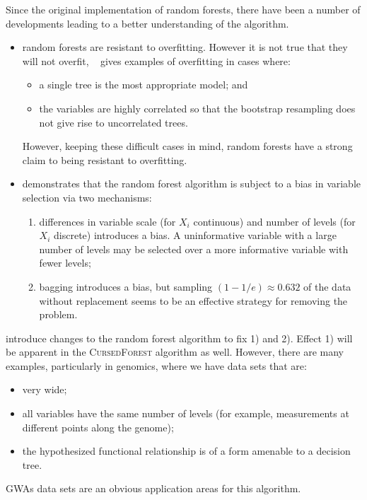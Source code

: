 \documentclass[10pt,letterpaper]{article}
\newcommand{\cursedforest}{\textsc{CursedForest}\xspace}
\begin{document}
Since the original implementation of random forests, there have been a number of developments leading to a better
understanding of the algorithm.
\begin{itemize}
\item random forests are resistant to overfitting. However it is not true that they will not overfit,
  ~\cite{Segal.2004} gives examples of overfitting in cases where:
  \begin{itemize}
  \item a single tree is the most appropriate model; and
  \item the variables are highly correlated so that the bootstrap resampling does not give rise to uncorrelated trees.
  \end{itemize}
However, keeping these difficult cases in mind, random forests have a strong claim to being resistant to overfitting.
\item \cite{Strobl.et.al.2007} demonstrates that the random forest algorithm is subject to a bias in variable selection
  via two mechanisms:
  \begin{enumerate}
  \item differences in variable scale (for $X_i$ continuous) and number of levels (for $X_i$ discrete) introduces a
    bias. A uninformative variable with a large number of levels may be selected over a more informative variable with
    fewer levels;
  \item bagging introduces a bias, but sampling $(1- 1/e) \approx 0.632$ of the data without replacement seems to be an
    effective strategy for removing the problem.
  \end{enumerate}
\end{itemize} 

\cite{Strobl.et.al.2007} introduce changes to the random forest algorithm to fix 1) and 2).  Effect 1) will be apparent
in the \cursedforest algorithm as well.  However, there are many examples, particularly in genomics, where we have data
sets that are:
\begin{itemize}
\item very wide;
\item all variables have the same number of levels (for example, measurements at different points along the genome);
\item the hypothesized functional relationship is of a form amenable to a decision tree.
\end{itemize}
GWAs data sets are an obvious application areas for this algorithm. 
\end{document}
